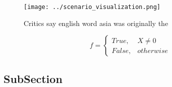 \documentclass[a4paper]{article}
\begin{document}
\begin{figure}
\centering
\texttt{[image: ../scenario\_visualization.png]}
\caption{Critics say english word asia was originally the 
}
\end{figure}
 
\begin{equation}   f =
\begin{cases} True, & X \neq 0\\
False, & otherwise
\end{cases}
\end{equation}

\subsection{SubSection}
\end{document}
